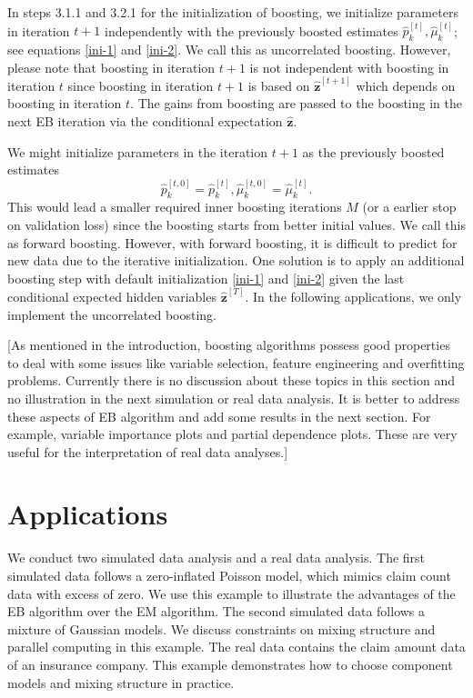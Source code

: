 \documentclass[11pt]{article}
\numberwithin{equation}{section}
\def\bz{\boldsymbol{z}}
\begin{document}
	In steps 3.1.1 and 3.2.1 for the initialization of boosting, 
	we initialize parameters in iteration $t+1$ {independently} with the previously boosted estimates $\hat{p}_k^{[t]}, \hat{\mu}_k^{[t]}$; see equations \eqref{ini-1} and \eqref{ini-2}. 
	We call this as uncorrelated boosting.
	However, please note that boosting in iteration $t+1$ is not independent with boosting in iteration $t$ since boosting in iteration $t+1$ is based on $\hat{\bz}^{[t+1]}$ which depends on boosting in iteration $t$. The gains from boosting are passed to  the boosting in the next EB iteration via the conditional expectation $\hat{\bz}$. 
	
	
	We might initialize parameters in the iteration $t+1$ as the previously boosted estimates $$\hat{p}_k^{[t,0]}=\hat{p}_k^{[t]}, \hat{\mu}_k^{[t,0]}=\hat{\mu}_k^{[t]}.$$
This would lead a {smaller} required inner boosting iterations $M$ (or a {earlier} stop on validation loss) since the boosting starts from better initial values.
	We call this as forward boosting. 
	However, with forward boosting, it is difficult to predict for new data due to the {iterative initialization}. One solution is to apply an additional boosting step with default initialization \eqref{ini-1} and \eqref{ini-2} given the {last conditional expected hidden variables $\hat{\bz}^{[T]}$}. In the following applications, we only implement the uncorrelated boosting.

{\color{blue}[As mentioned in the introduction, boosting algorithms possess good properties to deal with some issues like variable selection, feature engineering and overfitting problems. Currently there is no discussion about these topics in this section and no illustration in the next simulation or real data analysis. It is better to address these aspects of EB algorithm and add some results in the next section. For example, variable importance plots and partial dependence plots. These are very useful for the interpretation of real data analyses.]}

	
\section{Applications}\label{sec:application}

We conduct two simulated data analysis and a real data analysis. 
The first simulated data follows a zero-inflated Poisson model, which mimics claim count data with excess of zero.
We use this example to illustrate the advantages of the EB algorithm over the EM algorithm.
The second simulated data follows a mixture of Gaussian models. 
We discuss constraints on mixing structure and parallel computing in this example.
The real data contains the claim amount data of an insurance company. 
This example demonstrates how to choose component models and mixing structure in practice.
\end{document}
